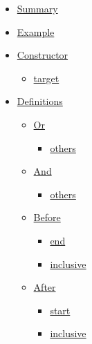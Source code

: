 \begin{itemize}
\tightlist
\item
  \hyperref[summary]{Summary}
\item
  \hyperref[example]{Example}
\item
  \hyperref[constructor]{Constructor}

  \begin{itemize}
  \tightlist
  \item
    \hyperref[constructor-target]{target}
  \end{itemize}
\item
  \hyperref[definitions]{Definitions}

  \begin{itemize}
  \tightlist
  \item
    \hyperref[definitions-or]{Or}

    \begin{itemize}
    \tightlist
    \item
      \hyperref[definitions-or-others]{others}
    \end{itemize}
  \item
    \hyperref[definitions-and]{And}

    \begin{itemize}
    \tightlist
    \item
      \hyperref[definitions-and-others]{others}
    \end{itemize}
  \item
    \hyperref[definitions-before]{Before}

    \begin{itemize}
    \tightlist
    \item
      \hyperref[definitions-before-end]{end}
    \item
      \hyperref[definitions-before-inclusive]{inclusive}
    \end{itemize}
  \item
    \hyperref[definitions-after]{After}

    \begin{itemize}
    \tightlist
    \item
      \hyperref[definitions-after-start]{start}
    \item
      \hyperref[definitions-after-inclusive]{inclusive}
    \end{itemize}
  \end{itemize}
\end{itemize}

